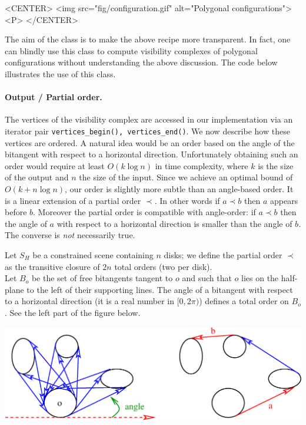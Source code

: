 \begin{ccHtmlOnly}
    <CENTER>
        <img src="fig/configuration.gif" alt="Polygonal configurations"><P>
    </CENTER>
\end{ccHtmlOnly}

The aim of the  class is to make the above recipe
more transparent. In fact, one can blindly use this class to compute visibility
complexes of polygonal configurations without understanding the above
discussion. The code below illustrates the use of this class.


\paragraph{Output / Partial order. } 
\label{sectionVComplexInputOutput}
The vertices of the visibility complex are
accessed in our implementation via an iterator pair \texttt{vertices\_begin(),
vertices\_end()}. We now describe how these vertices are ordered. A natural idea
would be an order based on the angle of the bitangent with respect to a
horizontal direction. Unfortunately obtaining such an order would require at
least $O(k \log n)$ in time complexity, where $k$ is the size of the output and
$n$ the size of the input. Since we achieve an optimal bound of $O(k + n\log
n)$, our order is slightly more subtle than an angle-based order. It is a linear
extension of a partial order $\prec$. In other words if $a \prec b$  then $a$
appears before $b$. Moreover the partial order is compatible with angle-order:
if $a \prec b$ then the angle of $a$ with respect to a horizontal direction is
smaller than the angle of $b$. The converse is \emph{not} necessarily true.

Let $S_H$ be a constrained scene containing $n$ disks; we define the partial
order $\prec$ as the transitive closure of $2n$ total orders (two per disk). \\
Let $B_o$ be the set of free bitangents tangent to $o$ and such that $o$ lies
on the half-plane to the left of their supporting lines. The angle of a
bitangent with respect to a horizontal direction (it is a real number in
$[0,2\pi)$) defines a total order on $B_o$. See the left part of the figure below.

\begin{ccTexOnly}
    \begin{center}
        \includegraphics[width=\textwidth]{fig/order.eps}%
    \end{center}
\end{ccTexOnly}

